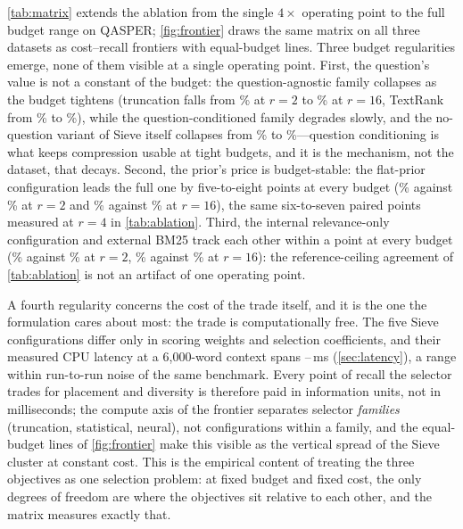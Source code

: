 \documentclass[preprint,12pt]{elsarticle}
\theoremstyle{remark}
\newcommand{\method}{Sieve}
\begin{document}
\autoref{tab:matrix} extends the ablation from the single $4\times$
operating point to the full budget range on QASPER;
\autoref{fig:frontier} draws the same matrix on all three datasets as
cost--recall frontiers with equal-budget lines. Three budget
regularities emerge, none of them visible at a single operating
point. First, the question's value is not a constant of the budget:
the question-agnostic family collapses as the budget tightens
(truncation falls from \MxQHeaTwo\% at $r{=}2$ to \MxQHeaSixteen\% at
$r{=}16$, TextRank from \MxQTRTwo\% to \MxQTRSixteen\%), while the
question-conditioned family degrades slowly, and the no-question
variant of \method{} itself collapses from \MxQNoQTwo\% to
\MxQNoQSixteen\%---question conditioning is what keeps compression
usable at tight budgets, and it is the mechanism, not the dataset,
that decays. Second, the prior's price is budget-stable: the
flat-prior configuration leads the full one by five-to-eight points
at every budget (\MxQNoPosTwo\% against \MxQSieTwo\% at $r{=}2$ and
\MxQNoPosSixteen\% against \MxQSieSixteen\% at $r{=}16$), the same
six-to-seven paired points measured at $r{=}4$ in
\autoref{tab:ablation}. Third, the internal relevance-only
configuration and external BM25 track each other within a point at
every budget (\MxQRelOnlyTwo\% against \MxQBmTwo\% at $r{=}2$,
\MxQRelOnlySixteen\% against \MxQBmSixteen\% at $r{=}16$): the
reference-ceiling agreement of \autoref{tab:ablation} is not an
artifact of one operating point.

A fourth regularity concerns the cost of the trade itself, and it is
the one the formulation cares about most: the trade is
computationally free. The five \method{} configurations differ only
in scoring weights and selection coefficients, and their measured CPU
latency at a 6{,}000-word context spans \TimeVMinSixk--\TimeVMaxSixk\,ms
(\autoref{sec:latency}), a range within run-to-run noise of the same
benchmark. Every point of recall the selector trades for placement
and diversity is therefore paid in information units, not in
milliseconds; the compute axis of the frontier separates selector
\emph{families} (truncation, statistical, neural), not configurations
within a family, and the equal-budget lines of \autoref{fig:frontier}
make this visible as the vertical spread of the \method{} cluster at
constant cost. This is the empirical content of treating the three
objectives as one selection problem: at fixed budget and fixed cost,
the only degrees of freedom are where the objectives sit relative to
each other, and the matrix measures exactly that.
\end{document}
